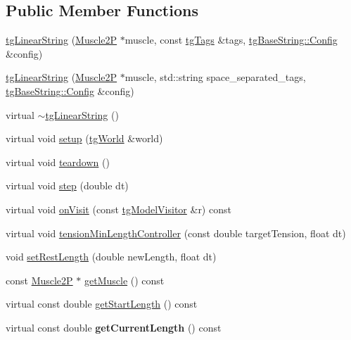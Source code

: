 \subsection*{Public Member Functions}
\begin{DoxyCompactItemize}
\item 
\hyperlink{classtg_linear_string_acb8874a75256a2d8ebd73b4c26e6396e}{tg\-Linear\-String} (\hyperlink{class_muscle2_p}{Muscle2\-P} $\ast$muscle, const \hyperlink{classtg_tags}{tg\-Tags} \&tags, \hyperlink{structtg_base_string_1_1_config}{tg\-Base\-String\-::\-Config} \&config)
\item 
\hyperlink{classtg_linear_string_af48bbfa51cd851cdaa88673292b354fd}{tg\-Linear\-String} (\hyperlink{class_muscle2_p}{Muscle2\-P} $\ast$muscle, std\-::string space\-\_\-separated\-\_\-tags, \hyperlink{structtg_base_string_1_1_config}{tg\-Base\-String\-::\-Config} \&config)
\item 
virtual \hyperlink{classtg_linear_string_a302829a71bb6ae05346d90ff2573c986}{$\sim$tg\-Linear\-String} ()
\item 
virtual void \hyperlink{classtg_linear_string_a022d8147ddc53a5449d22a74128231a7}{setup} (\hyperlink{classtg_world}{tg\-World} \&world)
\item 
virtual void \hyperlink{classtg_linear_string_a1c4be827e518aa1fc944dd14895b3892}{teardown} ()
\item 
virtual void \hyperlink{classtg_linear_string_ae6ffae9c4a4a9501b1933a2beceee67f}{step} (double dt)
\item 
virtual void \hyperlink{classtg_linear_string_a9f659486ba4276dc9d60982158fb7aa5}{on\-Visit} (const \hyperlink{classtg_model_visitor}{tg\-Model\-Visitor} \&r) const 
\item 
virtual void \hyperlink{classtg_linear_string_a616a328ef9d507069ab8e150c67b045a}{tension\-Min\-Length\-Controller} (const double target\-Tension, float dt)
\item 
void \hyperlink{classtg_linear_string_ad2ff47888e3687494392d6ceeb6245c4}{set\-Rest\-Length} (double new\-Length, float dt)
\item 
const \hyperlink{class_muscle2_p}{Muscle2\-P} $\ast$ \hyperlink{classtg_linear_string_a01de993b2269f8858068ce92c47becf9}{get\-Muscle} () const 
\item 
virtual const double \hyperlink{classtg_linear_string_a0a3df476e0c37c1ef78d41127b86631b}{get\-Start\-Length} () const 
\item 
\hypertarget{classtg_linear_string_afd458d6032da95ea372828815aadc85e}{virtual const double {\bfseries get\-Current\-Length} () const }\label{classtg_linear_string_afd458d6032da95ea372828815aadc85e}


\end{DoxyCompactItemize}
